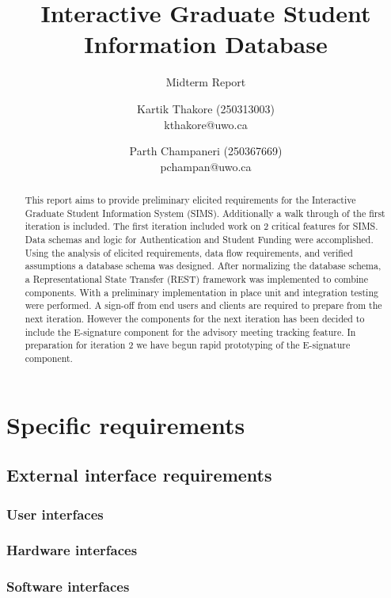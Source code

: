 \documentclass{journal}
\begin{document}

\nocite{*}
\title{Interactive Graduate Student Information Database}
\subtitle{Midterm Report} 
\author{Kartik Thakore (250313003)\\kthakore@uwo.ca \and Parth Champaneri (250367669)\\pchampan@uwo.ca}
\maketitle

\begin{abstract}
This report aims to provide preliminary elicited requirements for the Interactive Graduate Student Information System (SIMS). Additionally a walk through of the first iteration is included. The first iteration included work on 2 critical features for SIMS. Data schemas and logic for Authentication and Student Funding were accomplished. Using the analysis of elicited requirements, data flow requirements, and verified assumptions a database schema was designed. After normalizing the database schema, a Representational State Transfer (REST) framework was implemented to combine components. With a preliminary implementation in place unit and integration testing were performed. A sign-off from end users and clients are required to prepare from the next iteration. However the components for the next iteration has been decided to include the E-signature component for the advisory meeting tracking feature. In preparation for iteration 2 we have begun rapid prototyping of the E-signature component.
\end{abstract}

\section{Specific requirements}
\subsection{External interface requirements}
\subsubsection{User interfaces}
\subsubsection{Hardware interfaces}
\subsubsection{Software interfaces}
\end{document}
